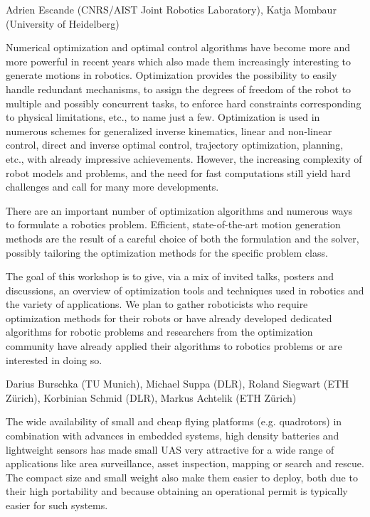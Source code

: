 \begin{spacing}{1.0}
{Adrien Escande (CNRS/AIST Joint Robotics Laboratory), Katja Mombaur (University of Heidelberg)}
{
Numerical optimization and optimal control algorithms have become more and more powerful in recent years which also made them increasingly interesting to generate motions in robotics.  Optimization provides the possibility to easily handle redundant mechanisms, to assign the degrees of freedom of the robot to multiple and possibly concurrent tasks, to enforce hard constraints corresponding to physical limitations, etc., to name just a few.  Optimization is used in numerous schemes for generalized inverse kinematics, linear and non-linear control, direct and inverse optimal control, trajectory optimization, planning, etc., with already impressive achievements. However, the increasing complexity of robot models and problems, and the need for fast computations still yield hard challenges and call for many more developments.

There are an important number of optimization algorithms and numerous ways to formulate a robotics problem. Efficient, state-of-the-art motion generation methods are the result of a careful choice of both the formulation and the solver, possibly tailoring the optimization methods for the specific problem class.

The goal of this workshop is to give, via a mix of invited talks, posters and discussions, an overview of optimization tools and techniques used in robotics and the variety of applications. We plan to gather roboticists who require optimization methods for their robots or have already developed dedicated algorithms for robotic problems and researchers from the optimization community have already applied their algorithms to robotics problems or are interested in doing so. 
}




{Darius Burschka (TU Munich), Michael Suppa (DLR), Roland Siegwart (ETH Zürich), Korbinian Schmid (DLR), Markus Achtelik (ETH Zürich)}
{
The wide availability of small and cheap flying platforms (e.g. quadrotors) in combination with advances in embedded systems, high density batteries and lightweight sensors has made small UAS very attractive for a wide range of applications like area surveillance, asset inspection, mapping or search and rescue. The compact size and small weight also make them easier to deploy, both due to their high portability and because obtaining an operational permit is typically easier for such systems.

}
\end{spacing}
